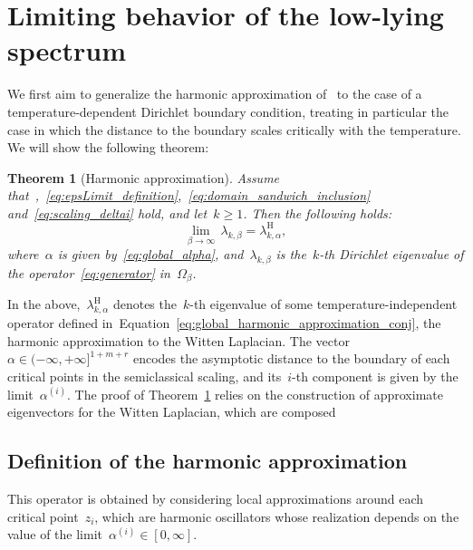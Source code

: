 \documentclass[10pt]{article}
\newcommand{\R}{\mathbb{R}}
\newcommand{\1}{\mathbbm 1}
\newcommand{\epsLimit}[1]{\alpha^{(#1)}} %
\newtheorem{theorem}{Theorem}
\newtheorem{definition}{Definition}
\begin{document}
    \section{Limiting behavior of the low-lying spectrum}
    \label{sec:harm}
    We first aim to generalize the harmonic approximation of~\cite{S83} to the case of a temperature-dependent Dirichlet boundary condition, treating in particular the case in which the distance to the boundary scales critically with the temperature.
    We will show the following theorem:
    \begin{theorem}[Harmonic approximation]
        \label{thm:harm_approx}
        Assume that~,~\eqref{eq:epsLimit_definition},~\eqref{eq:domain_sandwich_inclusion} and~\eqref{eq:scaling_deltai} hold, and let~$k\geq 1$. Then the following holds:
        \begin{equation}
            \label{eq:harm_limit}
            \underset{\beta\to\infty}{\lim}\,\lambda_{k,\beta} = \lambda_{k,\alpha}^{\mathrm{H}},
        \end{equation}
        where~$\alpha$ is given by~\eqref{eq:global_alpha}, and~$\lambda_{k,\beta}$ is the~$k$-th Dirichlet eigenvalue of the operator~\eqref{eq:generator} in~$\Omega_\beta$.
    \end{theorem}
    In the above,~$\lambda_{k,\alpha}^{\mathrm H}$ denotes the~$k$-th eigenvalue of some temperature-independent operator defined in~Equation~\eqref{eq:global_harmonic_approximation_conj}, the harmonic approximation to the Witten Laplacian. The vector~$\alpha\in(-\infty,+\infty]^{1+m+r}$ encodes the asymptotic distance to the boundary of each critical points in the semiclassical scaling, and its~$i$-th component is given by the limit~$\epsLimit{i}$.
    The proof of Theorem~\ref{thm:harm_approx} relies on the construction of approximate eigenvectors for the Witten Laplacian, which are composed 

    \subsection{Definition of the harmonic approximation}
    This operator is obtained by considering local approximations around each critical point~$z_i$, which are harmonic oscillators whose realization depends on the value of the limit~$\epsLimit{i} \in [0,\infty]$.
\end{document}
